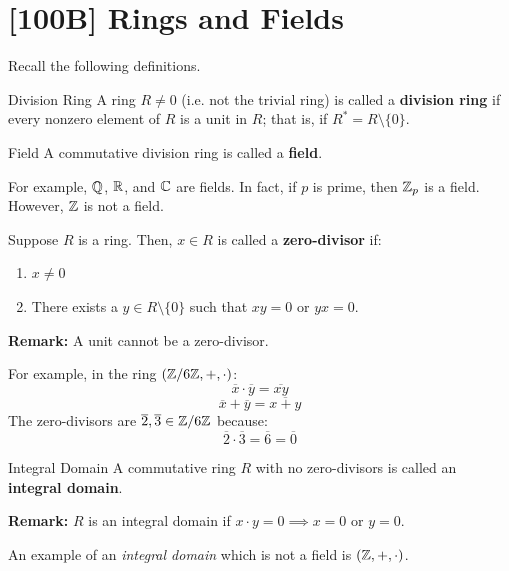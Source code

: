 \documentclass[letterpaper]{article}
\begin{document}
\newpage 
\section{[100B] Rings and Fields}
Recall the following definitions.
\begin{definition}{Division Ring}{}
    A ring $R \neq 0$ (i.e. not the trivial ring) is called a \textbf{division ring} if every nonzero element of $R$ is a unit in $R$; that is, if $R^* = R \setminus \{0\}$.
\end{definition}

\begin{definition}{Field}{}
    A commutative division ring is called a \textbf{field}. 
\end{definition}
For example, $\mathbb{Q}$, $\mathbb{R}$, and $\mathbb{C}$ are fields. In fact, if $p$ is prime, then $\mathbb{Z}_p$ is a field. However, $\mathbb{Z}$ is not a field. 

\begin{definition}{}{}
    Suppose $R$ is a ring. Then, $x \in R$ is called a \textbf{zero-divisor} if:
    \begin{enumerate}
        \item $x \neq 0$
        \item There exists a $y \in R \setminus \{0\}$ such that $xy = 0$ or $yx = 0$. 
    \end{enumerate}
\end{definition}
\textbf{Remark:} A unit cannot be a zero-divisor.

\bigskip

For example, in the ring $(\mathbb{Z} / 6\mathbb{Z}, +, \cdot)$:
\[\overline{x} \cdot \overline{y} = \overline{xy}\]
\[\overline{x} + \overline{y} = \overline{x + y}\]
The zero-divisors are $\overline{2}, \overline{3} \in \mathbb{Z} / 6\mathbb{Z}$ because: 
\[\overline{2} \cdot \overline{3} = \overline{6} = \overline{0}\]


\begin{definition}{Integral Domain}{}
    A commutative ring $R$ with no zero-divisors is called an \textbf{integral domain}.
\end{definition}
\textbf{Remark:} $R$ is an integral domain if $x \cdot y = 0 \implies x = 0 \text{ or } y = 0$.

\bigskip

An example of an \emph{integral domain} which is not a field is $(\mathbb{Z}, +, \cdot)$.
\end{document}
